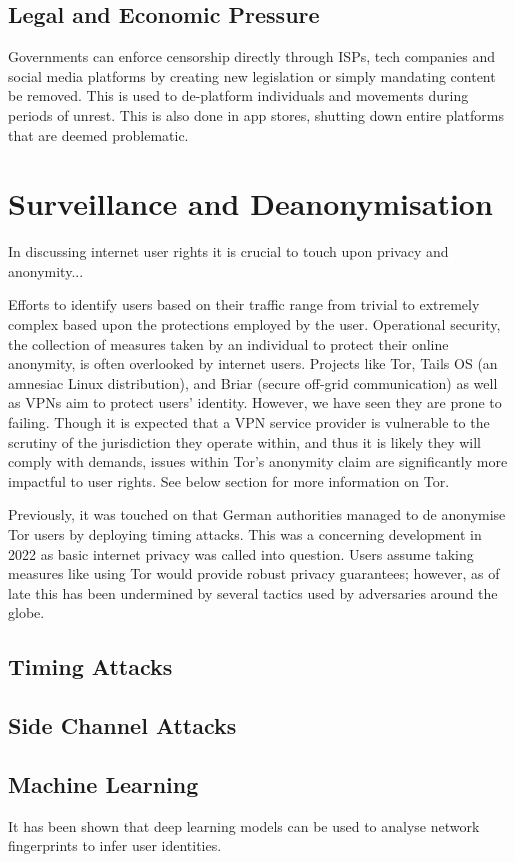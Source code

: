 \subsection{Legal and Economic Pressure}
Governments can enforce censorship directly through ISPs, tech companies and social media platforms by creating new legislation or simply mandating content be removed. This is used to de-platform individuals and movements during periods of unrest. This is also done in app stores, shutting down entire platforms that are deemed problematic.












\section{Surveillance and Deanonymisation}

In discussing internet user rights it is crucial to touch upon privacy and anonymity...

Efforts to identify users based on their traffic range from trivial to extremely complex based upon the protections employed by the user. Operational security, the collection of measures taken by an individual to protect their online anonymity, is often overlooked by internet users. Projects like Tor, Tails OS (an amnesiac Linux distribution), and Briar (secure off-grid communication) as well as VPNs aim to protect users’ identity. However, we have seen they are prone to failing. Though it is expected that a VPN service provider is vulnerable to the scrutiny of the jurisdiction they operate within, and thus it is likely they will comply with demands, issues 
within Tor’s anonymity claim are significantly more impactful to user rights. See below section for more information on Tor. 

Previously, it was touched on that German authorities managed to de anonymise Tor users by deploying timing attacks. This was a concerning development in 2022 as basic internet privacy was called into question. Users assume taking measures like using Tor would provide robust privacy guarantees; however, as of late this has been undermined by several tactics used by adversaries around the globe. 
 
\subsection{Timing Attacks}
 
 
\subsection{Side Channel Attacks}
 
 
\subsection{Machine Learning}
It has been shown that deep learning models can be used to analyse network fingerprints to infer user identities.
